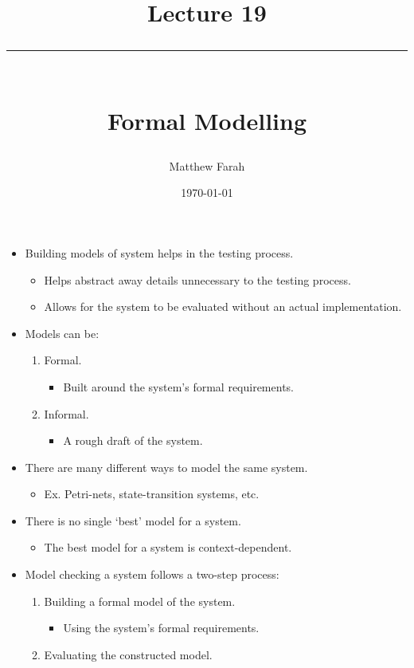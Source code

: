 \documentclass{article}
\date{
	\vspace{-.75em}
	{\large \today}
}
\title{
	\vspace*{-1.5em}
	{\Huge Lecture 19} \\
	\vspace{-1em}
	\rule{\textwidth/4}{.01em} \\
	\vspace{-.25em}
	{\Large Formal Modelling}
	\vspace{-.75em}
}
\author{
	{\large Matthew Farah}
}
\newcounter{example}
\newcounter{step}
\begin{document}
\maketitle
\pagestyle{fancy}

\fi

\begin{itemize}
	\item Building models of system helps in the testing process.
	\begin{itemize}
		\item Helps abstract away details unnecessary to the testing process.
		\item Allows for the system to be evaluated without an actual implementation.
	\end{itemize}
	\item Models can be:
	\begin{enumerate}
		\item Formal.
		\begin{itemize}
			\item Built around the system's formal requirements.
		\end{itemize}
		\item Informal.
		\begin{itemize}
			\item A rough draft of the system.
		\end{itemize}
	\end{enumerate}
	\item There are many different ways to model the same system.
	\begin{itemize}
		\item Ex. Petri-nets, state-transition systems, etc.
	\end{itemize}
	\item There is no single `best' model for a system.
	\begin{itemize}
		\item The best model for a system is context-dependent.
	\end{itemize}
	\item Model checking a system follows a two-step process:
	\begin{enumerate}
		\item Building a formal model of the system.
		\begin{itemize}
			\item Using the system's formal requirements.
		\end{itemize}
		\item Evaluating the constructed model.

\end{enumerate}
\end{itemize}
\end{document}
